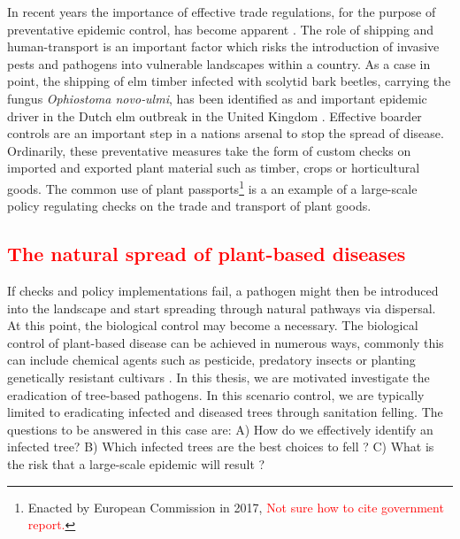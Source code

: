 In recent years the importance of effective trade regulations, for the purpose of preventative epidemic control, has become apparent \cite{rodoni2009role}. The role of shipping and human-transport is an important factor which risks the introduction of invasive pests and pathogens into vulnerable landscapes within a country. As a case in point, the shipping of elm timber infected with scolytid bark beetles, carrying the fungus \textit{Ophiostoma novo‐ulmi}, has been identified as and important epidemic driver in the Dutch elm outbreak in the United Kingdom \cite{doi:10.1111/j.1365-3059.2010.02391.x}. Effective boarder controls are an important step in a nations arsenal to stop the spread of disease. Ordinarily, these preventative measures take the form of custom checks on imported and exported plant material such as timber, crops or horticultural goods. The common use of plant passports\footnote{Enacted by European Commission in 2017, \textcolor{red}{Not sure how to cite government report.}} is a an example of a large-scale policy regulating checks on the trade and transport of plant goods. 

\subsection{\textcolor{red}{The natural spread of plant-based diseases}}
If checks and policy implementations fail, a pathogen might then be introduced into the landscape and start spreading through natural pathways via dispersal. At this point, the biological control may become a necessary. The biological control of plant-based disease can be achieved in numerous ways, commonly this can include chemical agents such as pesticide, predatory insects or planting genetically resistant cultivars \cite{pal2006biological, baker1974biological}. In this thesis, we are motivated investigate the eradication of tree-based pathogens. In this scenario control, we are typically limited to eradicating infected and diseased trees through sanitation felling. The questions to be answered in this case are: A) How do we effectively identify an infected tree? B) Which infected trees are the best choices to fell ? C) What is the risk that a large-scale epidemic will result ?\\


